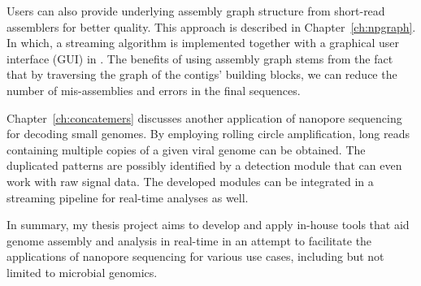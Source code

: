 Users can also provide underlying assembly graph structure from short-read assemblers for better quality. This approach is described in Chapter~\ref{ch:npgraph}. In which, a streaming algorithm is implemented together with a graphical user interface (GUI) in \npgraph{}. The benefits of using assembly graph stems from the fact that by traversing the graph of the contigs' building blocks, we can reduce the number of mis-assemblies and errors in the final sequences. 

Chapter~\ref{ch:concatemers} discusses another application of nanopore sequencing for decoding small genomes. By employing rolling circle amplification, long reads containing multiple copies of a given viral genome can be obtained. The duplicated patterns are possibly identified by a detection module that can even work with raw signal data. The developed modules can be integrated in a streaming pipeline for real-time analyses as well.

In summary, my thesis project aims to develop and apply in-house tools that aid genome assembly and analysis in real-time in an attempt to facilitate the applications of nanopore sequencing for various use cases, including but not limited to microbial genomics.

